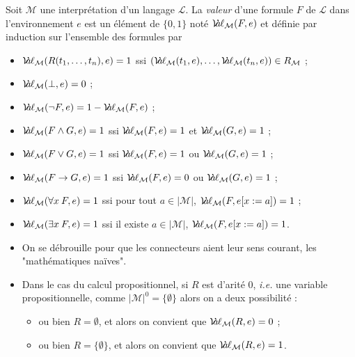 \documentclass[./main]{subfiles}
\begin{document}
  \begin{defn}
    Soit $\mathcal{M}$ une interprétation d'un langage $\mathcal{L}$.
    La \textit{valeur} d'une formule $F$ de $\mathcal{L}$ dans l'environnement $e$ est un élément de $\{0,1\}$ noté $\Val_\mathcal{M}(F, e)$ et définie par induction sur l'ensemble des formules par 

    {
      \footnotesize
    \begin{itemize}
      \item $\Val_\mathcal{M}(R(t_1, \ldots, t_n), e) = 1$  ssi $(\Val_\mathcal{M}(t_1, e), \ldots, \Val_\mathcal{M}(t_n ,e)) \in R_\mathcal{M}$ ;
      \item $\Val_\mathcal{M}(\bot, e) = 0$ ;
      \item $\Val_\mathcal{M}(\lnot F, e) = 1 - \Val_\mathcal{M}(F, e)$ ;
      \item $\Val_\mathcal{M}(F \land G, e) = 1$ ssi $\Val_\mathcal{M}(F, e) = 1$ et $\Val_\mathcal{M}(G, e) = 1$ ;
      \item $\Val_\mathcal{M}(F \lor G, e) = 1$ ssi $\Val_\mathcal{M}(F, e) = 1$ ou $\Val_\mathcal{M}(G, e) = 1$ ;
      \item $\Val_\mathcal{M}(F \to G, e) = 1$ ssi $\Val_\mathcal{M}(F, e) = 0$ ou $\Val_\mathcal{M}(G, e) = 1$ ;
      \item $\Val_\mathcal{M}(\forall x\:F, e) = 1$ ssi pour tout $a \in |\mathcal{M}|$, $\Val_\mathcal{M}(F, e[x := a]) = 1$ ;
      \item $\Val_\mathcal{M}(\exists x\:F, e) = 1$ ssi il existe $a \in |\mathcal{M}|$, $\Val_\mathcal{M}(F, e[x := a]) = 1$.
    \end{itemize}
    }
  \end{defn}


  \begin{rmk}
    \begin{itemize}
      \item On se débrouille pour que les connecteurs aient leur sens courant, les "mathématiques naïves".
      \item Dans le cas du calcul propositionnel, si $R$ est d'arité $0$, \textit{i.e.} une variable propositionnelle, comme $|\mathcal{M}|^0 = \{\emptyset\}$ alors on a deux possibilité :
        \begin{itemize}
          \item ou bien $R = \emptyset$, et alors on convient que $\Val_\mathcal{M}(R, e) = 0$ ;
          \item ou bien $R = \{\emptyset\} $, et alors on convient que $\Val_\mathcal{M}(R, e) = 1$.
        \end{itemize}
    \end{itemize}
  \end{rmk}
\end{document}
